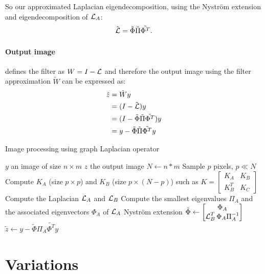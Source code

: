 So our approximated Laplacian eigendecomposition, using the Nystr\"om extension and eigendecomposition of \(\operatorname{\mathcal{L}}_A\):
\[\tilde{\operatorname{\mathcal{L}}} = \tilde{\Phi} \tilde{\Pi} \tilde{\Phi^T}.\]

\paragraph{Output image}
\cite{modern_tour_2013} defines the filter as \(W = I - \operatorname{\mathcal{L}}\) and therefore the output image using the filter approximation \(\tilde{W}\) can be expressed as:
\begin{equation}
 \begin{split}
     \tilde{z} & = \tilde{W}y \\
               & = (I - \tilde{\operatorname{\mathcal{L}}}) y \\
               & = (I - \tilde{\Phi} \tilde{\Pi} \tilde{\Phi^T}) y \\
               & = y - \tilde{\Phi} \tilde{\Pi} \tilde{\Phi^T} y
 \end{split}
\end{equation}

\begin{algorithm}[H]
 \caption{Image processing using graph Laplacian operator}
 \begin{algorithmic}
  \REQUIRE \(y\) an image of size \(n \times m\)
  \ENSURE \(z\) the output image
  \STATE \(N \leftarrow n*m\)
  \STATE {}
  \STATE Sample \(p\) pixels, \(p \ll N\)
  \STATE {}
  \STATE Compute \(K_A\) (size \(p \times p\)) and \(K_B\) (size \(p \times (N-p)\)) such as \(K = \begin{bmatrix} K_A & K_B \\ K_B^T & K_C \end{bmatrix}\)
  \STATE Compute the Laplacian \(\operatorname{\mathcal{L}}_A\) and \(\operatorname{\mathcal{L}}_B\)
  \STATE {}
  \STATE Compute the smallest eigenvalues \(\Pi_A\) and the associated eigenvectors \(\Phi_A\) of \(\operatorname{\mathcal{L}}_A\)
  \STATE Nystr\"om extension \(\tilde{\Phi} \leftarrow \begin{bmatrix} \Phi_A \\ \operatorname{\mathcal{L}}_B^T \Phi_A \Pi_A^{-1} \end{bmatrix}\)
  \STATE {}
  \STATE \(\tilde{z} \leftarrow y - \tilde{\Phi} \Pi_A \tilde{\Phi^T} y\)
 \end{algorithmic}
\end{algorithm}

\section{Variations}

